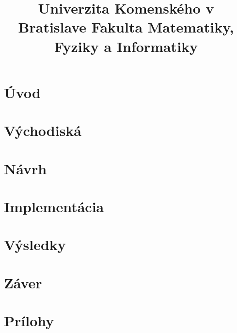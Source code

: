 \documentclass[12pt,a4paper]{bachelor}
\title{Univerzita Komenského v Bratislave Fakulta Matematiky, Fyziky a Informatiky}
\author{\autor}
\begin{document}



\tableofcontents
\newpage

\chapter*{Úvod}


\chapter{Východiská}


\chapter{Návrh}


\chapter{Implementácia}


\chapter{Výsledky}


\chapter*{Záver}


\printbibliography

\chapter*{Prílohy}


\label{totalpages}
\end{document}
